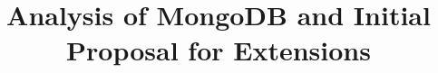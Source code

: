 \documentclass{dependencies/acm_proc_article-sp}
\begin{document}
\title{ Analysis of MongoDB and Initial Proposal for Extensions }
%
%
%
%
%
\end{document}
